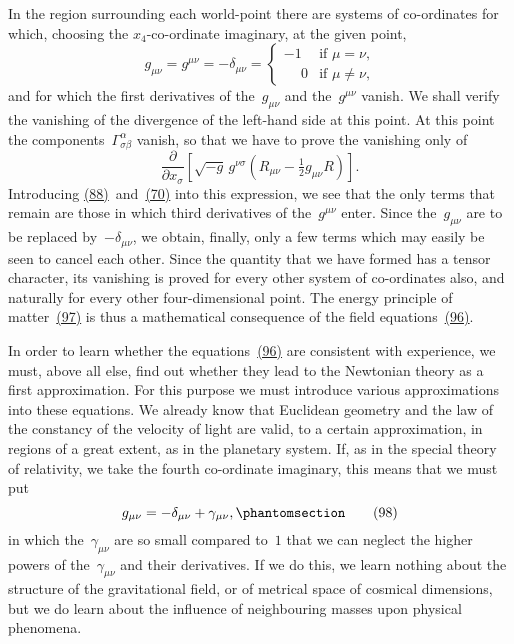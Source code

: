 \documentclass[12pt]{book}[2005/09/16]
\newcommand{\Change}[2]{#2}
\newcommand{\Add}[1]{\Change{}{#1}}
\newcommand{\PageSep}[1]{\ignorespaces}
\newcommand{\Tag}[1]{%
  \phantomsection
  \label{eqn:#1}
  \tag*{#1}
}
\newcommand{\Eqref}[1]{\hyperref[eqn:#1]{#1}}
\newcommand{\dd}{\partial}
\newcommand{\Neg}[1][{\,}]{\phantom{#1-#1}}
\begin{document}
In the region surrounding each world-point there are
systems of co-ordinates for which, choosing the $x_{\Change{\mu}{4}}$-co-ordinate
imaginary, at the given point,
\[
g_{\mu\nu} = g^{\mu\nu}
  = -\delta_{\mu\nu}
  = \begin{cases}
    -1 & \text{if $\mu = \nu$\Add{,}} \\
    \Neg[]0 & \text{if $\mu \neq \nu$,}
  \end{cases}
\]
and for which the first derivatives of the~$g_{\mu\nu}$ and the~$g^{\mu\nu}$
vanish. We shall verify the vanishing of the divergence
of the left-hand side at this point. At this point
the components~$\Gamma_{\sigma\beta}^{\alpha}$ vanish, so that we have to prove
the vanishing only of
\[
\frac{\dd}{\dd x_{\sigma}} \left[
  \sqrt{-g}\, g^{\nu\sigma} (R_{\mu\nu} - \tfrac{1}{2}g_{\mu\nu} R)
\right].
\]
\PageSep{94}
Introducing \Eqref{(88)}~and~\Eqref{(70)} into this expression, we see
that the only terms that remain are those in which third
derivatives of the~$g^{\mu\nu}$ enter. Since the~$g_{\mu\nu}$ are to be
replaced by~$-\delta_{\mu\nu}$, we obtain, finally, only a few terms
which may easily be seen to cancel each other. Since
the quantity that we have formed has a tensor character,
its vanishing is proved for every other system of co-ordinates
also, and naturally for every other four-dimensional
point. The energy principle of matter~\Eqref{(97)} is thus a
mathematical consequence of the field equations~\Eqref{(96)}.

In order to learn whether the equations~\Eqref{(96)} are
consistent with experience, we must, above all else, find
out whether they lead to the Newtonian theory as a
first approximation. For this purpose we must introduce
various approximations into these equations. We
already know that Euclidean geometry and the law of the
constancy of the velocity of light are valid, to a certain
approximation, in regions of a great extent, as in the
planetary system. If, as in the special theory of relativity,
we take the fourth co-ordinate imaginary, this
means that we must put
\[
g_{\mu\nu} = -\delta_{\mu\nu} + \gamma_{\mu\nu}\Add{,}
\Tag{(98)}
\]
in which the~$\gamma_{\mu\nu}$ are so small compared to~$1$ that we
can neglect the higher powers of the~$\gamma_{\mu\nu}$ and their
derivatives. If we do this, we learn nothing about the
structure of the gravitational field, or of metrical space of
cosmical dimensions, but we do learn about the influence
of neighbouring masses upon physical phenomena.
\end{document}
